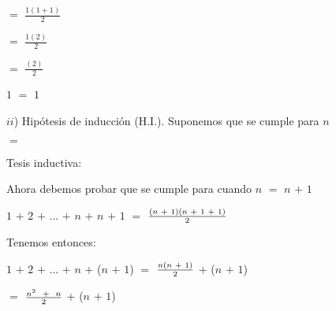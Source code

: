 \documentclass[12pt]{article}
\begin{document}
\hspace{5.4cm} $=$ {\LARGE{$\frac{1(1+1)}{2}$}} \vspace{0.5cm}

\hspace{5.4cm} $=$ {\LARGE{$\frac{1(2)}{2}$}} \vspace{0.5cm}

\hspace{5.4cm} $=$ {\LARGE{$\frac{(2)}{2}$}} \vspace{0.5cm}

\hspace{5cm} $1$ $=$ $1$ \vspace{0.5cm}

$ii$) Hipótesis de inducción (H.I.). Suponemos que se cumple para $n$ \vspace{0.5cm }

\hspace{5cm}  $=$  \vspace{0.5cm }

Tesis inductiva: \vspace{0.5cm }

Ahora debemos probar que se cumple para cuando $n$ $=$ $n$ $+$ $1$ \vspace{0.5cm}

\hspace{3cm} $1$ $+$ $2$ $+$ ... $+$ $n$ $+$ $n$ $+$ $1$ $=$ {\LARGE{$\frac{(n \hspace{0.1cm}+\hspace{0.1cm} 1) (n\hspace{0.1cm} + \hspace{0.1cm}1\hspace{0.1cm} +\hspace{0.1cm} 1)}{2}$}} \vspace{0.5cm }

Tenemos entonces: \vspace{0.5cm}

\hspace{3cm} $1$ $+$ $2$ $+$ ... $+$ $n$ $+$ ($n$ $+$ $1$) $=$ {\LARGE{$\frac{n(n\hspace{0.1cm} + \hspace{0.1cm}1)}{2}$}} $+$ ($n$ $+$ $1$) \vspace{0.5cm }

\hspace{8.8cm} $=$ {\LARGE{$\frac{n^{2}\hspace{0.2cm}+\hspace{0.2cm}n}{2}$}} $+$ ($n$ $+$ $1$) \vspace{0.5cm }
\end{document}
